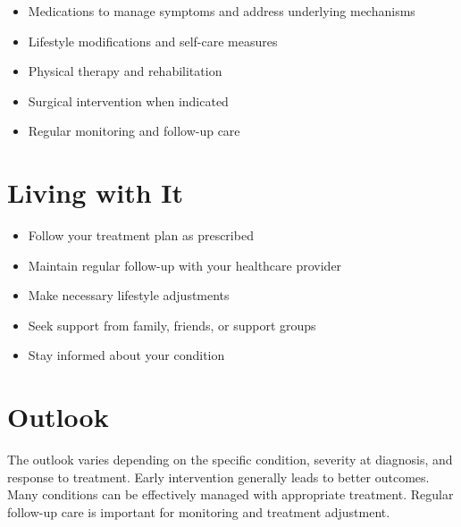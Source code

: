 \begin{itemize}[noitemsep]
  \item Medications to manage symptoms and address underlying mechanisms
  \item Lifestyle modifications and self-care measures
  \item Physical therapy and rehabilitation
  \item Surgical intervention when indicated
  \item Regular monitoring and follow-up care
\end{itemize}
\section{Living with It}
\begin{itemize}[noitemsep]
  \item Follow your treatment plan as prescribed
  \item Maintain regular follow-up with your healthcare provider
  \item Make necessary lifestyle adjustments
  \item Seek support from family, friends, or support groups
  \item Stay informed about your condition
\end{itemize}
\section{Outlook}
The outlook varies depending on the specific condition, severity at diagnosis, and response to treatment. Early intervention generally leads to better outcomes. Many conditions can be effectively managed with appropriate treatment. Regular follow-up care is important for monitoring and treatment adjustment.
